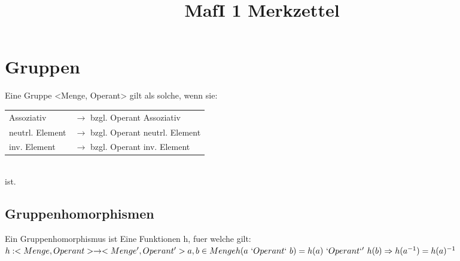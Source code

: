 \documentclass{article}
\title{MafI 1 Merkzettel}
\begin{document}
\maketitle
\section{Gruppen}
Eine Gruppe <Menge, Operant> gilt als solche, wenn sie:\\
\begin{tabular}{ll}
        Assoziativ          & $\rightarrow$ bzgl. Operant Assoziativ\\
        neutrl. Element     & $\rightarrow$ bzgl. Operant neutrl. Element\\
        inv. Element        & $\rightarrow$ bzgl. Operant inv. Element\\
\end{tabular}\\
ist.\\
\subsection{Gruppenhomorphismen}
Ein Gruppenhomorphismus ist Eine Funktionen h, fuer welche gilt:\\
$
h: <Menge,Operant> \rightarrow <Menge', Operant'>\\
a,b \in Menge\\
h(a\ `Operant`\ b) = h(a)\ `Operant`'\ h(b)\\
\Rightarrow h(a^{-1}) = h(a)^{-1}\\
$
\\
\end{document}
